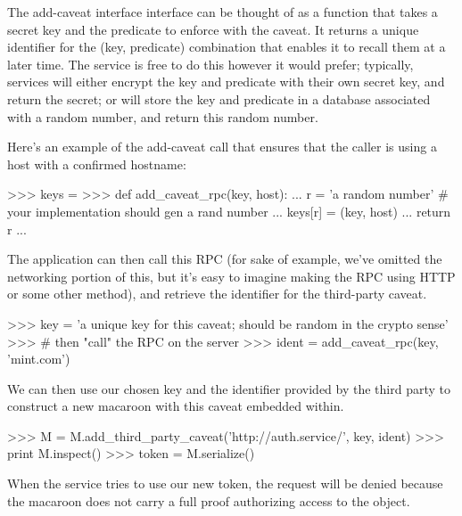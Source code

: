 The add-caveat interface interface can be thought of as a function that takes a
secret key and the predicate to
enforce with the caveat.  It returns a unique identifier for the (key,
predicate) combination that enables it to recall them at a later time.  The
service is free to do this however it would prefer; typically, services will
either encrypt the key and predicate with their own secret key, and return the
secret; or will store the key and predicate in a database associated with a
random number, and return this random number.

Here's an example of the add-caveat call that ensures that the caller is using a
host with a confirmed hostname:

\begin{pythoncode}
>>> keys = {}
>>> def add_caveat_rpc(key, host):
...     r = 'a random number' # your implementation should gen a rand number
...     keys[r] = (key, host)
...     return r
...
\end{pythoncode}

The application can then call this RPC (for sake of example, we've omitted the
networking portion of this, but it's easy to imagine making the RPC using HTTP
or some other method), and retrieve the identifier for the third-party caveat.

\begin{pythoncode}
>>> key = 'a unique key for this caveat; should be random in the crypto sense'
>>> # then "call" the RPC on the server
>>> ident = add_caveat_rpc(key, 'mint.com')
\end{pythoncode}

We can then use our chosen key and the identifier provided by the third party to
construct a new macaroon with this caveat embedded within.

\begin{pythoncode}
>>> M = M.add_third_party_caveat('http://auth.service/', key, ident)
>>> print M.inspect()
>>> token = M.serialize()
\end{pythoncode}

When the service tries to use our new token, the request will be denied because
the macaroon does not carry a full proof authorizing access to the object.

